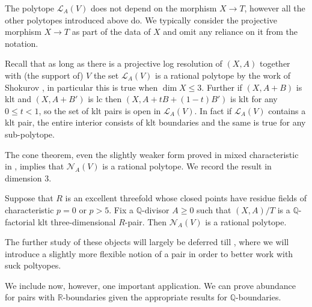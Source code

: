 \begin{remark}
	
	The polytope $\mathcal{L}_{A}(V)$ does not depend on the morphism $X \to T$, however all the other polytopes introduced above do. We typically consider the projective morphism $X \to T$ as part of the data of $X$ and omit any reliance on it from the notation.
	
	\end{remark}

Recall that as long as there is a projective log resolution of $(X,A)$ together with (the support of) $V$ the set $\mathcal{L}_{A}(V)$ is a rational polytope by the work of Shokurov \cite{Sho92}, in particular this is true when $\dim X \leq 3$. Further if $(X,A+B)$ is klt and $(X,A+B')$ is lc then $(X,A+tB+(1-t)B')$ is klt for any $0 \leq t < 1$, so the set of klt pairs is open in $\mathcal{L}_{A}(V)$. In fact if $\mathcal{L}_{A}(V)$ contains a klt pair, the entire interior consists of klt boundaries and the same is true for any sub-polytope.

The cone theorem, even the slightly weaker form proved in mixed characteristic in \cite{bhatt2020}, implies that $\mathcal{N}_{A}(V)$ is a rational polytope. We record the result in dimension $3$.

\begin{lemma}\label{neftope} \cite[Proposition 9.31]{bhatt2020}
	Suppose that $R$ is an excellent threefold whose closed points have residue fields of characteristic $p=0$ or $p > 5$.
	Fix a $\mathbb{Q}$-divisor $A \geq 0$ such that $(X,A)/T$ is a $\mathbb{Q}$-factorial klt three-dimensional $R$-pair.
	Then $\mathcal{N}_{A}(V)$ is a rational polytope.
\end{lemma}

The further study of these objects will largely be deferred till , where we will introduce a slightly more flexible notion of a pair in order to better work with suck poltyopes.

We include now, however, one important application. We can prove abundance for pairs with $\mathbb{R}$-boundaries given the appropriate results for $\mathbb{Q}$-boundaries.

